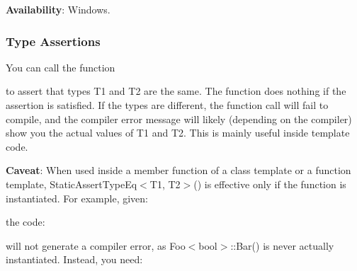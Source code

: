 \begin{DoxyCode}{0}
\end{DoxyCode}


{\bfseries{Availability}}\+: Windows.

\subsubsection*{Type Assertions}

You can call the function


\begin{DoxyCode}{0}
\end{DoxyCode}


to assert that types {\ttfamily T1} and {\ttfamily T2} are the same. The function does nothing if the assertion is satisfied. If the types are different, the function call will fail to compile, and the compiler error message will likely (depending on the compiler) show you the actual values of {\ttfamily T1} and {\ttfamily T2}. This is mainly useful inside template code.

{\bfseries{Caveat}}\+: When used inside a member function of a class template or a function template, {\ttfamily Static\+Assert\+Type\+Eq$<$T1, T2$>$()} is effective only if the function is instantiated. For example, given\+:


\begin{DoxyCode}{0}
\DoxyCodeLine{\};}
\end{DoxyCode}


the code\+:


\begin{DoxyCode}{0}
\end{DoxyCode}


will not generate a compiler error, as {\ttfamily Foo$<$bool$>$\+::\+Bar()} is never actually instantiated. Instead, you need\+:


\begin{DoxyCode}{0}
\end{DoxyCode}


